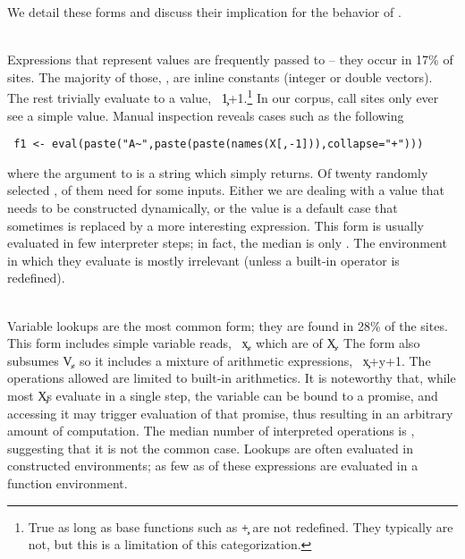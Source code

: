 \documentclass[review,screen,acmsmall,anonymous=true]{acmart}
\begin{document}
\medskip

 We detail these forms and discuss their implication for the behavior of \eval.

\newcommand{\EE}[1]{{{\emph{\framebox{#1}}}}\\[1mm]}

\medskip\noindent\EE{$min(e)=\c{V}$} Expressions that represent values are
frequently passed to \eval -- they occur in 17\% of sites. The majority of
those, \packageValOneNodePercent, are inline constants (integer or double
vectors). The rest trivially evaluate to a value, \eg~\c{1+1}.\footnote{True as
long as base functions such as \c{+} are not redefined. They typically are not,
but this is a limitation of this categorization.} In our corpus,
\packageNbCallSitesUniqueActualValue call sites only ever see a simple value.
Manual inspection reveals cases such as the following
\begin{lstlisting}
 f1 <- eval(paste("A~",paste(paste(names(X[,-1])),collapse="+")))
\end{lstlisting}
where the argument to \eval is a string which \eval simply returns. Of twenty
randomly selected \evals, \packageUsefulValueEvalPercent of them  need %
\eval for some inputs. Either we are dealing with a value that needs to be
constructed dynamically, or the value is a default case that sometimes is
replaced by a more interesting expression. This form is usually evaluated in few
interpreter steps; in fact, the median is only
\packageMinimizedmedianoperationscRnd. The environment in which they evaluate is
mostly irrelevant (unless a built-in operator is redefined).

\medskip\noindent\EE{$min(e)=\c{X}$} Variable lookups are the most common form; they are found in 28\% of the sites. This form includes simple variable reads,
\eg~\c{x}, which are \packageNbSymbolVarSitePercent of \c X. The form also
subsumes \c{V}, so it includes a mixture of arithmetic expressions,
\eg~\c{x+y+1}. The operations allowed are limited to built-in arithmetics. It is
noteworthy that, while most \c{X}\!s evaluate in a single step, the variable can
be bound to a promise, and accessing it may trigger evaluation of that promise,
thus resulting in an arbitrary amount of computation. The median number of
interpreted operations is \packageMinimizedmedianoperationsaRnd, suggesting that
it is not the common case. Lookups are often evaluated in constructed
environments; as few as \packageMinimizedpercentparentframesc of these
expressions are evaluated in a function environment.
\end{document}
